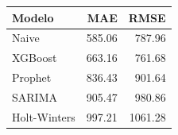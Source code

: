 \begin{tabular}{lrr}
\toprule
Modelo & MAE & RMSE \\
\midrule
Naive & 585.06 & 787.96 \\
XGBoost & 663.16 & 761.68 \\
Prophet & 836.43 & 901.64 \\
SARIMA & 905.47 & 980.86 \\
Holt-Winters & 997.21 & 1061.28 \\
\bottomrule
\end{tabular}
